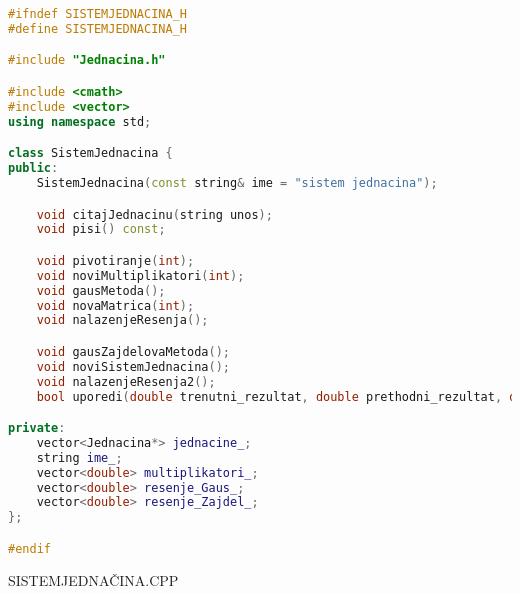 \documentclass[12pt,leqno,a4paper]{article}
\begin{document}
\begin{lstlisting}[language=C++ ]
#ifndef SISTEMJEDNACINA_H
#define SISTEMJEDNACINA_H

#include "Jednacina.h"

#include <cmath>
#include <vector>
using namespace std;

class SistemJednacina {
public:
	SistemJednacina(const string& ime = "sistem jednacina");

	void citajJednacinu(string unos);
	void pisi() const;

	void pivotiranje(int);
	void noviMultiplikatori(int);
	void gausMetoda();
	void novaMatrica(int);
	void nalazenjeResenja();

	void gausZajdelovaMetoda();
	void noviSistemJednacina();
	void nalazenjeResenja2();
	bool uporedi(double trenutni_rezultat, double prethodni_rezultat, double razlika=0.00001f);

private:
	vector<Jednacina*> jednacine_;
	string ime_;
	vector<double> multiplikatori_;
	vector<double> resenje_Gaus_;
	vector<double> resenje_Zajdel_;
};

#endif

\end{lstlisting}
SISTEMJEDNA\v CINA.CPP
\end{document}
